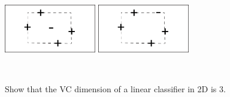 {\begin{minipage}{\linewidth}
\begin{itemize}
            \begin{center}
                \includegraphics[width=0.3\textwidth]{images/Bias-Variance Tradeoff_03.png}
                \hspace{1em}
                \includegraphics[width=0.3\textwidth]{images/Bias-Variance Tradeoff_04.png}
            \end{center}
        \end{itemize}
    \end{minipage}}\

    Show that the VC dimension of a linear classifier in 2D is 3.

